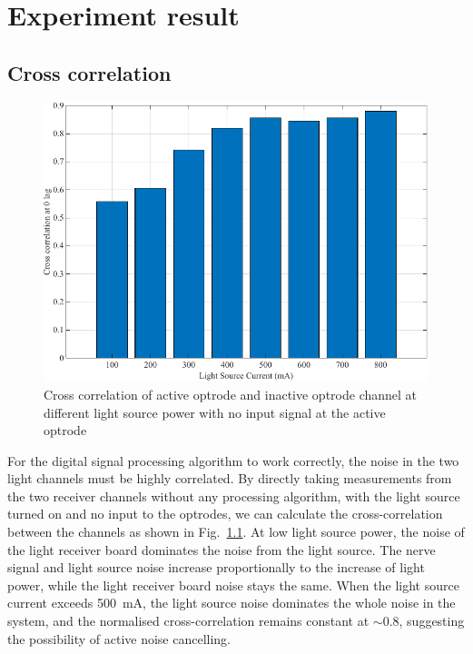 \chapter[Experiment]{Experiment result} \label{c:tc2} 

\section{Cross correlation}

\begin{figure}[H]
\centerline{\includegraphics[scale=1]{5-Experiment/Cross correlation.pdf}}
\caption{Cross correlation of active optrode and inactive optrode channel at different light source power with no input signal at the active optrode}
\label{fig_Cross correlation}
\end{figure}

For the digital signal processing algorithm to work correctly, the noise in the two light channels must be highly correlated.  By directly taking measurements from the two receiver channels without any processing algorithm, with the light source turned on and no input to the optrodes, we can calculate the cross-correlation between the channels as shown in Fig.~\ref{fig_Cross correlation}.  At low light source power, the noise of the light receiver board dominates the noise from the light source.  The nerve signal and light source noise increase proportionally to the increase of light power, while the light receiver board noise stays the same.  When the light source current exceeds \qty{500}{\mA}, the light source noise dominates the whole noise in the system, and the normalised cross-correlation remains constant at $\sim$0.8, suggesting the possibility of active noise cancelling.

